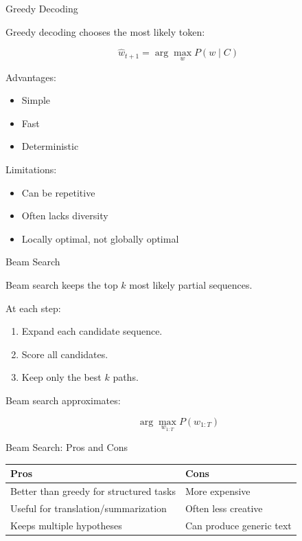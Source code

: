 \documentclass[aspectratio=169]{beamer}
\begin{document}
\begin{frame}{Greedy Decoding}

Greedy decoding chooses the most likely token:

\[
\hat{w}_{t+1}
=
\arg\max_{w}
P(w \mid C)
\]

\vspace{0.4cm}

Advantages:

\begin{itemize}
    \item Simple
    \item Fast
    \item Deterministic
\end{itemize}

Limitations:

\begin{itemize}
    \item Can be repetitive
    \item Often lacks diversity
    \item Locally optimal, not globally optimal
\end{itemize}

\end{frame}

\begin{frame}{Beam Search}

Beam search keeps the top $k$ most likely partial sequences.

\vspace{0.4cm}

At each step:

\begin{enumerate}
    \item Expand each candidate sequence.
    \item Score all candidates.
    \item Keep only the best $k$ paths.
\end{enumerate}

\vspace{0.4cm}

Beam search approximates:

\[
\arg\max_{w_{1:T}}
P(w_{1:T})
\]

\end{frame}

\begin{frame}{Beam Search: Pros and Cons}

\begin{table}
\centering
\begin{tabular}{ll}
\toprule
Pros & Cons \\
\midrule
Better than greedy for structured tasks & More expensive \\
Useful for translation/summarization & Often less creative \\
Keeps multiple hypotheses & Can produce generic text \\
\bottomrule
\end{tabular}
\end{table}

\end{frame}
\end{document}
